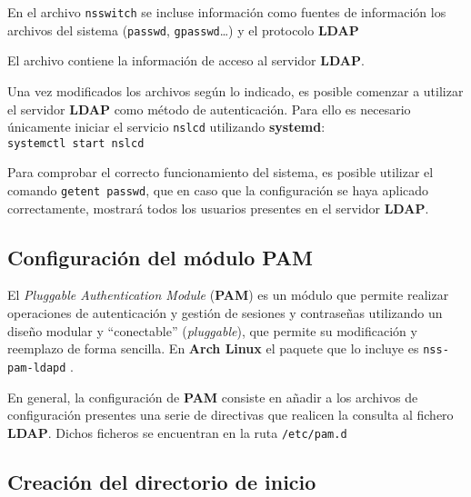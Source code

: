 \documentclass{article}
\begin{document}

En el archivo \texttt{nsswitch} se incluse información como fuentes de información los archivos del sistema (\texttt{passwd}, \texttt{gpasswd}\dots) y el protocolo \textbf{LDAP}


El archivo contiene la información de acceso al servidor \textbf{LDAP}.

Una vez modificados los archivos según lo indicado, es posible comenzar a utilizar el servidor \textbf{LDAP} como método de autenticación. Para ello es necesario únicamente iniciar el servicio \texttt{nslcd} utilizando \textbf{systemd}:\\

\texttt{systemctl start nslcd}

Para comprobar el correcto funcionamiento del sistema, es posible utilizar el comando \texttt{getent passwd}, que en caso que la configuración se haya aplicado correctamente, mostrará todos los usuarios presentes en el servidor \textbf{LDAP}.

\subsection{Configuración del módulo PAM}

El \textit{Pluggable Authentication Module} (\textbf{PAM}) es un módulo que permite realizar operaciones de autenticación y gestión de sesiones y contraseñas\cite{osfrfc86} utilizando un diseño modular y ``conectable'' (\textit{pluggable}), que permite su modificación y reemplazo de forma sencilla. En \textbf{Arch Linux} el paquete que lo incluye es \texttt{nss-pam-ldapd} \cite{nss-pam-ldap}.

En general, la configuración de \textbf{PAM} consiste en añadir a los archivos de configuración presentes una serie de directivas que realicen la consulta al fichero \textbf{LDAP}. Dichos ficheros se encuentran en la ruta \texttt{/etc/pam.d}




\subsection{Creación del directorio de inicio}
\end{document}

